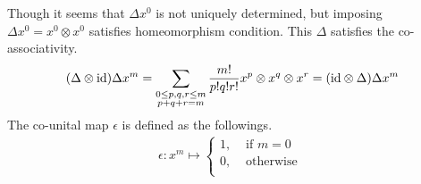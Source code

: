 Though it seems that $\Delta x^0$ is not uniquely determined, but
imposing $\Delta x^0 = x^0 \otimes x^0$ satisfies homeomorphism condition.
This $\Delta$ satisfies the co-associativity.
\begin{equation}\begin{split}
	(\Delta \otimes {\operatorname{id}})\Delta x^m
		= \sum_{\substack{0\le p,q,r\le m\\p+q+r=m}}\frac{m!}{p!q!r!} x^p \otimes x^q \otimes x^r
		= ({\operatorname{id}} \otimes \Delta)\Delta x^m
\end{split}\end{equation}
The co-unital map $\epsilon$ is defined as the followings.
\begin{equation}\begin{split}
	\epsilon: x^m \mapsto \begin{cases}
		1, &\text{ if } m = 0 \\
		0, &\text{ otherwise } \\
	\end{cases}
\end{split}\end{equation}

